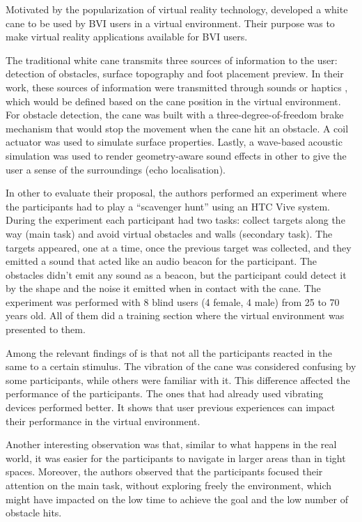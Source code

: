 Motivated by the popularization of virtual reality technology,  developed a white cane to be used by BVI users in a virtual environment. Their purpose was to make virtual reality applications available for BVI users. 

The traditional white cane transmits three sources of information to the user: detection of obstacles, surface topography and foot placement preview. In their work, these sources of information were transmitted through sounds or haptics \cite{siu2020virtual}, which would be defined based on the cane position in the virtual environment. For obstacle detection, the cane was built with a three-degree-of-freedom brake mechanism that would stop the movement when the cane hit an obstacle. A coil actuator was used to simulate surface properties. Lastly, a wave-based acoustic simulation was used to render geometry-aware sound effects in other to give the user a sense of the surroundings (echo localisation).

In other to evaluate their proposal, the authors performed an experiment where the participants had to play a “scavenger hunt” using an HTC Vive system. During the experiment each participant had two tasks: collect targets along the way (main task) and avoid virtual obstacles and walls (secondary task). The targets appeared, one at a time, once the previous target was collected, and they emitted a sound that acted like an audio beacon for the participant. The obstacles didn’t emit any sound as a beacon, but the participant could detect it by the shape and the noise it emitted when in contact with the cane. The experiment was performed with 8 blind users (4 female, 4 male) from 25 to 70 years old. All of them did a training section where the virtual environment was presented to them. 

Among the relevant findings of  is that not all the participants reacted in the same to a certain stimulus. The vibration of the cane was considered confusing by some participants, while others were familiar with it. This difference affected the performance of the participants. The ones that had already used vibrating devices performed better. It shows that user previous experiences can impact their performance in the virtual environment.

Another interesting observation was that, similar to what happens in the real world, it was easier for the participants to navigate in larger areas than in tight spaces. Moreover, the authors observed that the participants focused their attention on the main task, without exploring freely the environment, which might have impacted on the low time to achieve the goal and the low number of obstacle hits. 

